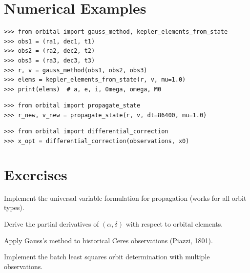 \section{Numerical Examples}

\begin{example}
\begin{lstlisting}[style=python]
>>> from orbital import gauss_method, kepler_elements_from_state
>>> obs1 = (ra1, dec1, t1)
>>> obs2 = (ra2, dec2, t2)
>>> obs3 = (ra3, dec3, t3)
>>> r, v = gauss_method(obs1, obs2, obs3)
>>> elems = kepler_elements_from_state(r, v, mu=1.0)
>>> print(elems)  # a, e, i, Omega, omega, M0
\end{lstlisting}
\end{example}

\begin{example}
\begin{lstlisting}[style=python]
>>> from orbital import propagate_state
>>> r_new, v_new = propagate_state(r, v, dt=86400, mu=1.0)
\end{lstlisting}
\end{example}

\begin{example}
\begin{lstlisting}[style=python]
>>> from orbital import differential_correction
>>> x_opt = differential_correction(observations, x0)
\end{lstlisting}
\end{example}

\section{Exercises}

\begin{exercise}
Implement the universal variable formulation for propagation (works for all orbit types).
\end{exercise}

\begin{exercise}
Derive the partial derivatives of $(\alpha, \delta)$ with respect to orbital elements.
\end{exercise}

\begin{exercise}
Apply Gauss's method to historical Ceres observations (Piazzi, 1801).
\end{exercise}

\begin{exercise}
Implement the batch least squares orbit determination with multiple observations.
\end{exercise}

